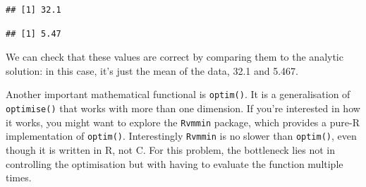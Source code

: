 \begin{Shaded}
\begin{Highlighting}[]
\StringTok{ }\NormalTok{(}\NormalTok{, }\NormalTok{, }\NormalTok{, }\NormalTok{, }\NormalTok{, }\NormalTok{, }\NormalTok{, }\NormalTok{, }\NormalTok{, }\NormalTok{)}
\StringTok{ }\NormalTok{(}\NormalTok{, }\NormalTok{, }\NormalTok{, }\NormalTok{, }\NormalTok{, }\NormalTok{, }\NormalTok{, }\NormalTok{, }\NormalTok{, }\NormalTok{, }\NormalTok{, }\NormalTok{, }\NormalTok{, }\NormalTok{, }\NormalTok{)}
\StringTok{ }
\StringTok{ }

\NormalTok{(}\NormalTok{, }\NormalTok{))}\OperatorTok{$}
\end{Highlighting}
\end{Shaded}

\begin{verbatim}
## [1] 32.1
\end{verbatim}

\begin{Shaded}
\begin{Highlighting}[]
\NormalTok{(}\NormalTok{, }\NormalTok{))}\OperatorTok{$}
\end{Highlighting}
\end{Shaded}

\begin{verbatim}
## [1] 5.47
\end{verbatim}

We can check that these values are correct by comparing them to the
analytic solution: in this case, it's just the mean of the data, 32.1
and 5.467.

Another important mathematical functional is \texttt{optim()}. It is a
generalisation of \texttt{optimise()} that works with more than one
dimension. If you're interested in how it works, you might want to
explore the \texttt{Rvmmin} package, which provides a pure-R
implementation of \texttt{optim()}. Interestingly \texttt{Rvmmin} is no
slower than \texttt{optim()}, even though it is written in R, not C. For
this problem, the bottleneck lies not in controlling the optimisation
but with having to evaluate the function multiple times.

